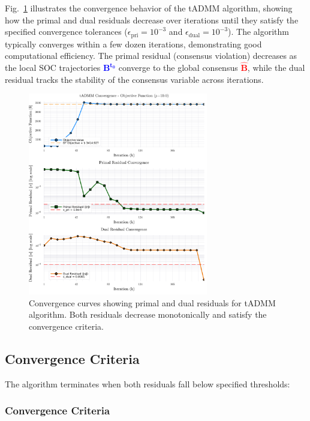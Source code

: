 Fig.~\ref{fig:convergence_curves} illustrates the convergence behavior of the tADMM algorithm, showing how the primal and dual residuals decrease over iterations until they satisfy the specified convergence tolerances ($\epsilon_{\text{pri}} = 10^{-3}$ and $\epsilon_{\text{dual}} = 10^{-3}$). The algorithm typically converges within a few dozen iterations, demonstrating good computational efficiency. The primal residual (consensus violation) decreases as the local SOC trajectories \textcolor{blue}{$\mathbf{B^{t_0}}$} converge to the global consensus \textcolor{red}{$\mathbf{\hat{B}}$}, while the dual residual tracks the stability of the consensus variable across iterations.

\begin{figure}[h]
    \centering
    \includegraphics[width=0.7\textwidth]{figures/convergence-curves-copper-plate-T24-tadmm.png}
    \caption{Convergence curves showing primal and dual residuals for tADMM algorithm. Both residuals decrease monotonically and satisfy the convergence criteria.}
    \label{fig:convergence_curves}
\end{figure}

\subsection{Convergence Criteria}

The algorithm terminates when both residuals fall below specified thresholds:

\subsubsection{Convergence Criteria}

